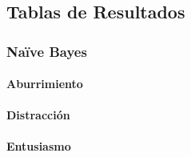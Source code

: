\chapter{}

\section{Tablas de Resultados}
\label{Anexos_Resultados}


\clearpage

\subsection{Naïve Bayes}

\subsubsection{Aburrimiento}

\clearpage
\FloatBarrier
\subsubsection{Distracción}

\clearpage
\FloatBarrier
\subsubsection{Entusiasmo}